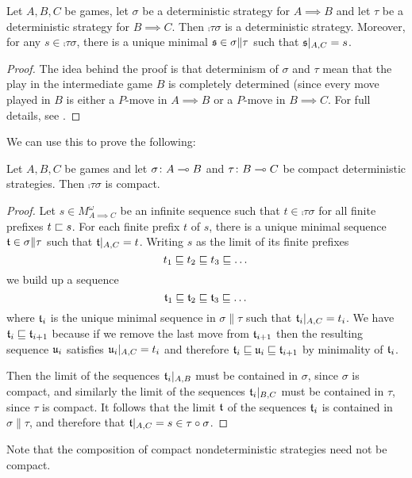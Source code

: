 \documentclass{article}
\begin{document}
\begin{proposition}
  Let $A,B,C$ be games, let $\sigma$ be a deterministic strategy for $A\implies B$ and let $\tau$ be a deterministic strategy for $B\implies C$.  Then $\comp\tau\sigma$ is a deterministic strategy.  Moreover, for any $s\in\comp\tau\sigma$, there is a unique minimal $\mathfrak s\in\sigma\|\tau$ such that $\mathfrak s\vert_{A,C}=s$.
  \begin{proof}
    The idea behind the proof is that determinism of $\sigma$ and $\tau$ mean that the play in the intermediate game $B$ is completely determined (since every move played in $B$ is either a $P$-move in $A\implies B$ or a $P$-move in $B\implies C$.  For full details, see \cite{abramskyjagadeesangames}.
  \end{proof}
\end{proposition}

We can use this to prove the following:

\begin{proposition}
  Let $A,B,C$ be games and let $\sigma\colon A\multimap B$ and $\tau\colon B\multimap C$ be compact deterministic strategies.  Then $\comp\tau\sigma$ is compact.
  \begin{proof}
    Let $s\in M_{A\implies C}^\omega$ be an infinite sequence such that $t\in\comp\tau\sigma$ for all finite prefixes $t\sqsubset s$.  For each finite prefix $t$ of $s$, there is a unique minimal sequence $\mathfrak t\in\sigma\|\tau$ such that $\mathfrak t\vert_{A,C}=t$.  Writing $s$ as the limit of its finite prefixes
    \[
      t_1 \sqsubseteq t_2 \sqsubseteq t_3 \sqsubseteq \dots
      \]
    we build up a sequence
    \[
      \mathfrak t_1 \sqsubseteq \mathfrak t_2 \sqsubseteq \mathfrak t_3 \sqsubseteq \dots
      \]
    where $\mathfrak t_i$ is the unique minimal sequence in $\sigma\|\tau$ such that $\mathfrak t_i\vert_{A,C}=t_i$.  We have $\mathfrak t_i\sqsubseteq\mathfrak t_{i+1}$ because if we remove the last move from $\mathfrak t_{i+1}$ then the resulting sequence $\mathfrak u_i$ satisfies $\mathfrak u_i\vert_{A,C}=t_i$ and therefore $\mathfrak t_i\sqsubseteq\mathfrak u_i\sqsubseteq\mathfrak t_{i+1}$ by minimality of $\mathfrak t_i$.  

    Then the limit of the sequences $\mathfrak t_i\vert_{A,B}$ must be contained in $\sigma$, since $\sigma$ is compact, and similarly the limit of the sequences $\mathfrak t_i\vert_{B,C}$ must be contained in $\tau$, since $\tau$ is compact.  It follows that the limit $\mathfrak t$ of the sequences $\mathfrak t_i$ is contained in $\sigma\|\tau$, and therefore that $\mathfrak t\vert_{A,C}=s\in\tau \circ \sigma$.
  \end{proof}
\end{proposition}

Note that the composition of compact nondeterministic strategies need not be compact.
\end{document}
